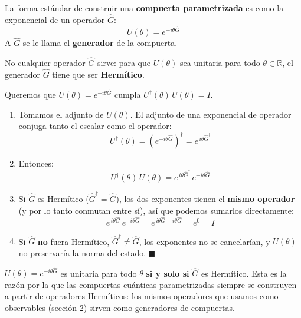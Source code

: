 \documentclass[12pt]{article}
\newcommand{\R}{\mathbb{R}}
\begin{document}
\begin{definicion}
La forma estándar de construir una \textbf{compuerta parametrizada} es como
la exponencial de un operador $\hat{G}$:
\[
U(\theta) = e^{-i\theta \hat{G}}
\]
A $\hat{G}$ se le llama el \textbf{generador} de la compuerta.
\end{definicion}

No cualquier operador $\hat{G}$ sirve: para que $U(\theta)$ sea unitaria
para todo $\theta \in \R$, el generador $\hat{G}$ tiene que ser
\textbf{Hermítico}.

\begin{ejemplo}[title=\textbf{Demostración: por qué $\hat{G}$ debe ser Hermítico}]
Queremos que $U(\theta) = e^{-i\theta\hat{G}}$ cumpla $U^\dagger(\theta)
\, U(\theta) = I$.

\begin{enumerate}
    \item Tomamos el adjunto de $U(\theta)$. El adjunto de una exponencial
    de operador conjuga tanto el escalar como el operador:
    \[
    U^\dagger(\theta) = \left(e^{-i\theta\hat{G}}\right)^{\!\dagger}
    = e^{\,i\theta \hat{G}^\dagger}
    \]

    \item Entonces:
    \[
    U^\dagger(\theta)\, U(\theta) = e^{\,i\theta \hat{G}^\dagger} \,
    e^{-i\theta \hat{G}}
    \]

    \item Si $\hat{G}$ es Hermítico ($\hat{G}^\dagger = \hat{G}$), los dos
    exponentes tienen el \textbf{mismo operador} (y por lo tanto conmutan
    entre sí), así que podemos sumarlos directamente:
    \[
    e^{\,i\theta \hat{G}} \, e^{-i\theta \hat{G}}
    = e^{\,i\theta\hat{G} - i\theta\hat{G}} = e^{0} = I
    \]

    \item Si $\hat{G}$ \textbf{no} fuera Hermítico, $\hat{G}^\dagger \neq
    \hat{G}$, los exponentes no se cancelarían, y $U(\theta)$ no
    preservaría la norma del estado. $\blacksquare$
\end{enumerate}
\end{ejemplo}

\begin{importante}
$U(\theta) = e^{-i\theta\hat{G}}$ es unitaria para todo $\theta$
\textbf{si y solo si} $\hat{G}$ es Hermítico. Esta es la razón por la que
las compuertas cuánticas parametrizadas siempre se construyen a partir de
operadores Hermíticos: los mismos operadores que usamos como observables
(sección 2) sirven como generadores de compuertas.
\end{importante}
\end{document}

